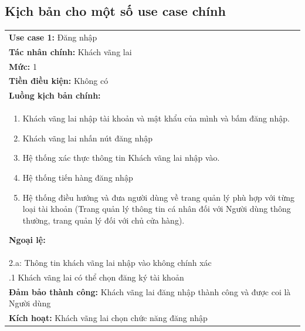 \subsection{Kịch bản cho một số use case chính}
\begin{center}
	\begin{tabularx}{\linewidth}{|X|}
		\cline{1-2}
		\textbf{Use case 1:} Đăng nhập                                                             \\
		\textbf{Tác nhân chính:} Khách vãng lai                                                    \\
		\textbf{Mức:} 1                                                                            \\
		\textbf{Tiền điều kiện:} Không có                                                          \\
		\textbf{Luồng kịch bản chính:}                                                             \\
		\begin{enumerate}
			\vspace{-2em}
			\itemsep-0.5em
			\item Khách vãng lai nhập tài khoản và mật khẩu của mình và bấm đăng nhập.
			\item Khách vãng lai nhấn nút đăng nhập
			\item Hệ thống xác thực thông tin Khách vãng lai nhập vào.
			\item Hệ thống tiến hàng đăng nhập
			\item Hệ thống điều hướng và đưa người dùng về trang quản lý phù hợp với từng loại tài khoản (Trang quản lý thông tin cá nhân đối với Người dùng thông thường, trang quản lý đối với chủ cửa hàng).
			      \vspace{-1em}
		\end{enumerate}
		\textbf{Ngoại lệ:}                                                                         \\
		\hspace{1em}2.a: Thông tin khách vãng lai nhập vào không chính xác                         \\
		\hspace{2.5em}.1 Khách vãng lai có thể chọn đăng ký tài khoản                              \\
		\textbf{Đảm bảo thành công:} Khách vãng lai đăng nhập thành công và được coi là Người dùng \\
		\textbf{Kích hoạt:} Khách vãng lai chọn chức năng đăng nhập
		\cline{1-2}
	\end{tabularx}
\end{center}

